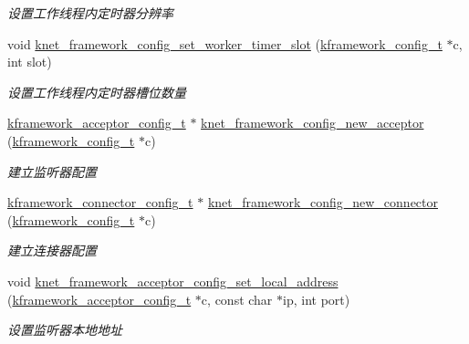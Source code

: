 \begin{DoxyCompactItemize}
\begin{DoxyCompactList}\small\item\em 设置工作线程内定时器分辨率 \end{DoxyCompactList}\item 
void \hyperlink{a00111_gae0c5bc540a44a88d64390845744f736f_gae0c5bc540a44a88d64390845744f736f}{knet\+\_\+framework\+\_\+config\+\_\+set\+\_\+worker\+\_\+timer\+\_\+slot} (\hyperlink{a00054_adeaf952e0f0887507ff836385bf54874_adeaf952e0f0887507ff836385bf54874}{kframework\+\_\+config\+\_\+t} $\ast$c, int slot)
\begin{DoxyCompactList}\small\item\em 设置工作线程内定时器槽位数量 \end{DoxyCompactList}\item 
\hyperlink{a00054_a39c993eb450173e4fde04498d757f9b6_a39c993eb450173e4fde04498d757f9b6}{kframework\+\_\+acceptor\+\_\+config\+\_\+t} $\ast$ \hyperlink{a00111_ga681a7f8e071507cc60f8f56043fe4443_ga681a7f8e071507cc60f8f56043fe4443}{knet\+\_\+framework\+\_\+config\+\_\+new\+\_\+acceptor} (\hyperlink{a00054_adeaf952e0f0887507ff836385bf54874_adeaf952e0f0887507ff836385bf54874}{kframework\+\_\+config\+\_\+t} $\ast$c)
\begin{DoxyCompactList}\small\item\em 建立监听器配置 \end{DoxyCompactList}\item 
\hyperlink{a00054_a44d3033eba5a4fd784a741700a7a2521_a44d3033eba5a4fd784a741700a7a2521}{kframework\+\_\+connector\+\_\+config\+\_\+t} $\ast$ \hyperlink{a00111_ga135342b1a0a31db4d614ee96a76d3e46_ga135342b1a0a31db4d614ee96a76d3e46}{knet\+\_\+framework\+\_\+config\+\_\+new\+\_\+connector} (\hyperlink{a00054_adeaf952e0f0887507ff836385bf54874_adeaf952e0f0887507ff836385bf54874}{kframework\+\_\+config\+\_\+t} $\ast$c)
\begin{DoxyCompactList}\small\item\em 建立连接器配置 \end{DoxyCompactList}\item 
void \hyperlink{a00111_gae13e628b69405ef9a338980da9475b53_gae13e628b69405ef9a338980da9475b53}{knet\+\_\+framework\+\_\+acceptor\+\_\+config\+\_\+set\+\_\+local\+\_\+address} (\hyperlink{a00054_a39c993eb450173e4fde04498d757f9b6_a39c993eb450173e4fde04498d757f9b6}{kframework\+\_\+acceptor\+\_\+config\+\_\+t} $\ast$c, const char $\ast$ip, int port)
\begin{DoxyCompactList}\small\item\em 设置监听器本地地址 \end{DoxyCompactList}\item 

\end{DoxyCompactItemize}
